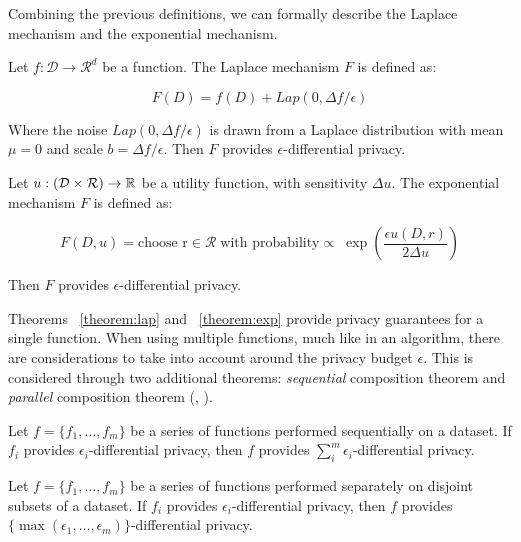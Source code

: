 Combining the previous definitions, we can formally describe the Laplace mechanism and the exponential mechanism.


\begin{theorem}\label{theorem:lap}
	Let $f: \mathcal{D} \rightarrow \mathcal{R}^d$ be a function. The Laplace mechanism $F$ is defined as:
	
	\begin{equation}
		F(D) = f(D) + Lap(0, \Delta f/\epsilon)
	\end{equation}
	
	Where the noise $Lap(0, \Delta f/\epsilon)$ is drawn from a Laplace distribution with mean $\mu = 0$ and scale $b = \Delta f / \epsilon$. Then $F$ provides $\epsilon$-differential privacy.
	
\end{theorem}

\begin{theorem}\label{theorem:exp}
	Let $u: (\mathcal{D \times \mathcal{R}}) \rightarrow \mathbb{R}$ be a utility function, with sensitivity $\Delta u$. The exponential mechanism $F$ is defined as:
	
	\begin{equation}
		F(D, u) = \text{choose r} \in \mathcal{R} \; \text{with probability} \propto \; \exp\left(\frac{\epsilon u(D, r)}{2\Delta u}\right)
	\end{equation}
	
	Then $F$ provides $\epsilon$-differential privacy.
	 
\end{theorem}

Theorems ~\ref{theorem:lap} and ~\ref{theorem:exp} provide privacy guarantees for a single function. When using multiple functions, much like in an algorithm, there are considerations to take into account around the privacy budget $\epsilon$. This is considered through two additional theorems: \textit{sequential} composition theorem and \textit{parallel} composition theorem (\cite{dwork_roth}, \cite{dpgbdt}).

\begin{theorem}\label{theorem:sequential_composition}
	Let $f = \{f_1, \dots, f_m\}$ be a series of functions performed sequentially on a dataset. If $f_i$ provides $\epsilon_i$-differential privacy, then $f$ provides $\sum_i^m \epsilon_i$-differential privacy.
\end{theorem}

\begin{theorem}\label{theorem:parallel_composition}
	Let $f = \{f_1, \dots, f_m\}$ be a series of functions performed separately on disjoint subsets of a dataset. If $f_i$ provides $\epsilon_i$-differential privacy, then $f$ provides $\{\max(\epsilon_1,\dots,\epsilon_m)\}$-differential privacy.
\end{theorem}










